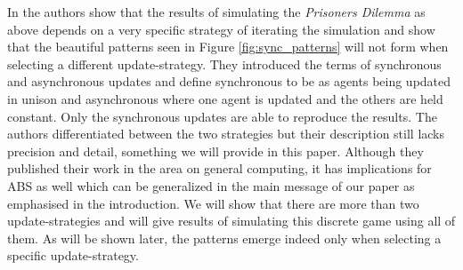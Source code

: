 In \cite{huberman_evolutionary_1993} the authors show that the results of simulating the \textit{Prisoners Dilemma} as above depends on a very specific strategy of iterating the simulation and show that the beautiful patterns seen in Figure \ref{fig:sync_patterns} will not form when selecting a different update-strategy. They introduced the terms of synchronous and asynchronous updates and define synchronous to be as agents being updated in unison and asynchronous where one agent is updated and the others are held constant. Only the synchronous updates are able to reproduce the results. The authors differentiated between the two strategies but their description still lacks precision and detail, something we will provide in this paper. Although they published their work in the area on general computing, it has implications for ABS as well which can be generalized in the main message of our paper as emphasised in the introduction. We will show that there are more than two update-strategies and will give results of simulating this discrete game using all of them. As will be shown later, the patterns emerge indeed only when selecting a specific update-strategy.

